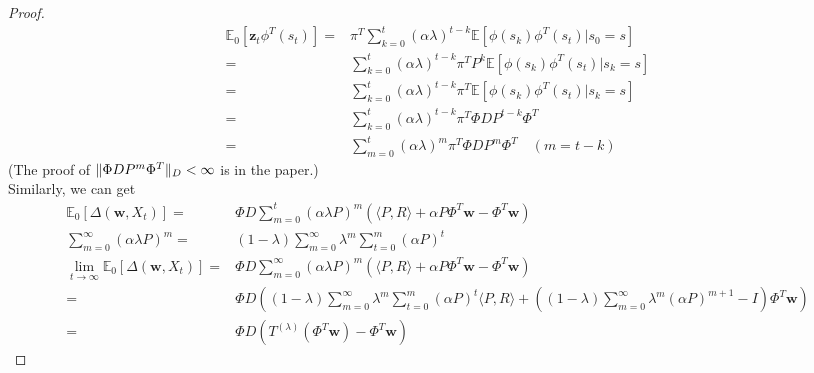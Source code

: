 \begin{lem}
    \begin{proof}
        \begin{equation}
            \begin{aligned}
                \mathbb{E}_0 [ \mathbf{z}_t \phi^T(s_t) ]
                =& \pi^T \sum^{t}_{k=0} {(\alpha \lambda)}^{t-k}
                \mathbb{E}[ \phi(s_k) \phi^T(s_t) |s_0 = s]\\
                =& \sum^{t}_{k=0} {(\alpha \lambda)}^{t-k}
                \pi^T P^k \mathbb{E}[ \phi(s_k) \phi^T(s_t) |s_k = s]\\
                =& \sum^{t}_{k=0} {(\alpha \lambda)}^{t-k}
                \pi^T \mathbb{E}[ \phi(s_k) \phi^T(s_t) |s_k = s]\\
                =& \sum^{t}_{k=0} {(\alpha \lambda)}^{t-k}
                \pi^T \Phi D P^{t-k} \Phi^T \\
                =& \sum^{t}_{m=0} {(\alpha \lambda)}^{m}
                \pi^T \Phi D P^{m} \Phi^T \quad (m = t-k)
            \end{aligned}
        \end{equation}
        (The proof of $\Arrowvert \Phi D P^m \Phi^T \Arrowvert_D < \infty$ is in the paper.)\\
        Similarly, we can get
        \begin{equation}
            \begin{aligned}
                \mathbb{E}_0 [\Delta( \mathbf{w}, X_t )]
                =& \Phi D \sum^{t}_{m=0} {(\alpha \lambda P)}^m ( \langle P, R \rangle 
                + \alpha P \Phi^T \mathbf{w} - \Phi^T \mathbf{w})\\
                \sum^{\infty}_{m=0} {(\alpha \lambda P)}^m 
                =& (1-\lambda) \sum^{\infty}_{m=0} \lambda^m \sum^{m}_{t=0} {(\alpha P)}^t\\
                \lim_{t \to \infty} \mathbb{E}_0 [\Delta( \mathbf{w}, X_t )]
                =& \Phi D \sum^{\infty}_{m=0} {(\alpha \lambda P)}^m ( \langle P, R \rangle 
                + \alpha P \Phi^T \mathbf{w} - \Phi^T \mathbf{w})\\
                =& \Phi D 
                \left(
                    (1-\lambda) \sum^{\infty}_{m=0} \lambda^m \sum^{m}_{t=0} {(\alpha P)}^t \langle P, R \rangle
                 + ((1-\lambda) \sum^{\infty}_{m=0} \lambda^m {(\alpha P)}^{m+1} - I ) \Phi^T \mathbf{w} \right)\\
                =& \Phi D (T^{(\lambda)} (\Phi^T \mathbf{w}) - \Phi^T \mathbf{w} )
            \end{aligned}
        \end{equation}
    \end{proof}
\end{lem}

